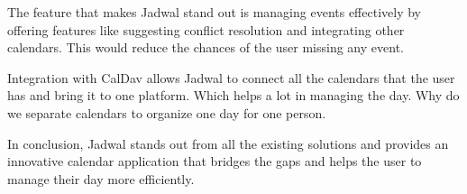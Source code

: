 \documentclass[12pt,a4paper]{report}
\begin{document}
The feature that makes Jadwal stand out is managing events effectively by offering features like suggesting conflict resolution and integrating other calendars. This would reduce the chances of the user missing any event.

Integration with CalDav allows Jadwal to connect all the calendars that the user has and bring it to one platform. Which helps a lot in managing the day. Why do we separate calendars to organize one day for one person. 

In conclusion, Jadwal stands out from all the existing solutions and provides an innovative calendar application that bridges the gaps and helps the user to manage their day more efficiently.




\end{document}
